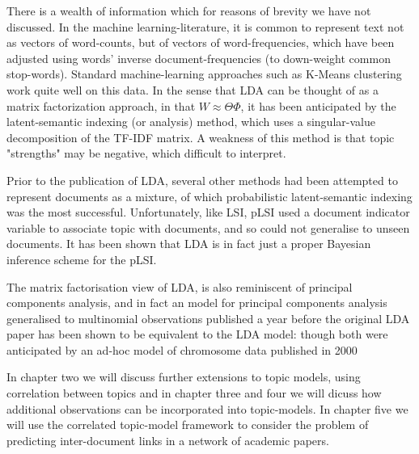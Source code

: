 There is a wealth of information which for reasons of brevity we have not discussed. In the machine learning-literature, it is common to represent text not as vectors of word-counts, but of vectors of word-frequencies, which have been adjusted using words' inverse document-frequencies (to down-weight common stop-words). Standard machine-learning approaches such as K-Means clustering work quite well on this data. In the sense that LDA can be thought of as a matrix factorization approach, in that $W \approx \Theta \Phi$, it has been anticipated by the latent-semantic indexing (or analysis) method, which uses a singular-value decomposition of the TF-IDF matrix. A weakness of this method is that topic "strengths" may be negative, which difficult to interpret. 

Prior to the publication of LDA, several other methods had been attempted to represent documents as a mixture, of which probabilistic latent-semantic indexing \cite{Hofmann1999a} was the most successful. Unfortunately, like LSI, pLSI used a document indicator variable to associate topic with documents, and so could not generalise to unseen documents. It has been shown\cite{GiKa2003} that LDA is in fact just a proper Bayesian inference scheme for the pLSI. 

The matrix factorisation view of LDA, is also reminiscent of principal components analysis, and in fact an model for principal components analysis generalised to multinomial observations\cite{Buntine2002} published a year before the original LDA paper has been shown to be equivalent to the LDA model: though both were anticipated by an ad-hoc model of chromosome data published in 2000\cite{Pritchard2000}

In chapter two we will discuss further extensions to topic models, using correlation between topics and in chapter three and four we will dicuss how additional observations can be incorporated into topic-models. In chapter five we will use the correlated topic-model framework to consider the problem of predicting inter-document links in a network of academic papers.


